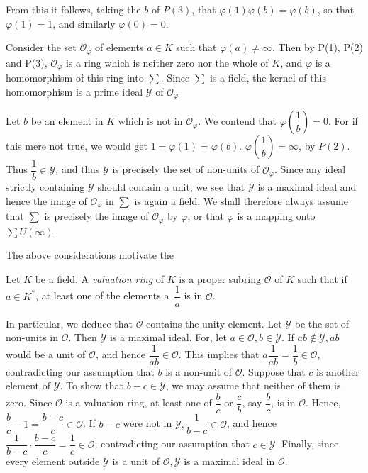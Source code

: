 From this it follows, taking the $b$ of $P(3)$, that $\varphi(1)
\varphi (b) = \varphi (b)$, so that $\varphi (1) = 1$, and similarly
$\varphi (0) = 0$. 

Consider the set $\mathscr{O}_{\varphi}$ of elements $a \in K$ such
that $\varphi (a) \neq \infty$. Then by P(1), P(2) and P(3),
$\mathscr{O}_{\varphi}$ is a ring which is neither zero nor the whole
of $K$, and $\varphi$ is a homomorphism of this ring into
$\sum$. Since $\sum$ is a field, the kernel of this homomorphism is a
prime ideal $\mathscr{Y}$  of $\mathscr{O}_{\varphi}$ 

Let $b$ be an element in $K$ which is not in
$\mathscr{O}_{\varphi}$. We contend that $\varphi (\dfrac{1}{b}) =
0$. For if this mere not true, we would get $1 = \varphi(1) = \varphi
(b)$. $\varphi (\dfrac{1}{b}) = \infty$, by $P(2)$. Thus $\dfrac{1}{b}
\in \mathscr{Y}$, and thus $\mathscr{Y}$ is precisely the set of
non-units of $\mathscr{O}_{\varphi}$. Since any ideal strictly
containing $\mathscr{Y}$ should contain a unit, we see that
$\mathscr{Y}$ is a maximal ideal and hence the image of
$\mathscr{O}_{\varphi}$ in $\sum$ is again a field. We shall therefore
always assume that $\sum$ is precisely the image of
$\mathscr{O}_{\varphi}$ by $\varphi$, or that $\varphi$ is a mapping
onto $\sum U (\infty)$. 

The above considerations motivate the 
\begin{defi*}
  Let $K$ be a field. A {\em valuation ring} of $K$ is a proper subring
  $\mathscr{O}$ of $K$ such that if  $a \in K^*$, at least one of the
  elements a\pageoriginale\, $\dfrac{1}{a}$ is in $\mathscr{O}$.  
\end{defi*}

In particular, we deduce that $\mathscr{O}$ contains the unity
element. Let $\mathscr{Y}$ be the set of non-units in
$\mathscr{O}$. Then $\mathscr{Y}$ is a maximal ideal. For, let $a \in
\mathscr{O}, b \in \mathscr{Y}$. If $a b \notin \mathscr{Y}, ab$ would
be a unit of $\mathscr{O}$, and hence $\dfrac{1}{ab} \in \mathscr{O}$.
This implies that $a \dfrac{1}{ab} = \dfrac{1}{b} \in \mathscr{O}$,
contradicting our assumption that $b$ is a non-unit of
$\mathscr{O}$. Suppose that $c$ is another element of
$\mathscr{Y}$. To show that $b - c \in \mathscr{Y}$, we may assume
that neither of them is zero. Since $\mathscr{O}$ is a valuation ring,
at least one of $\dfrac{b}{c}$ or $\dfrac{c}{b} $, say $\dfrac{b}{c}$,
is in $\mathscr{O}$. Hence, $\dfrac{b}{c} - 1 = \dfrac{b-c}{c} \in
\mathscr{O}$. If $b-c$ were not in $\mathscr{Y}, \dfrac{1}{b-c} \in
\mathscr{O}$, and hence $\dfrac{1}{b-c} \cdot \dfrac{b-c}{c} =
\dfrac{1}{c} \in \mathscr{O}$, contradicting our assumption that $c
\in \mathscr{Y}$. Finally, since every element outside $\mathscr{Y}$
is a unit of $\mathscr{O}, \mathscr{Y}$ is a maximal ideal in
$\mathscr{O}$. 
